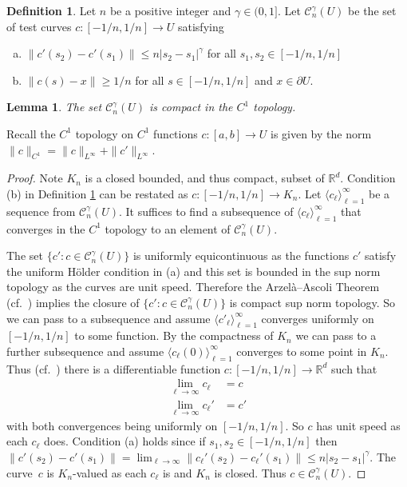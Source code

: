\documentclass[12pt]{amsart}
\numberwithin{equation}{section}
\newcommand{\la}{\langle}	   	%
\newcommand{\ra}{\rangle}          	%
\newcommand{\R}{{\mathbb R}}		%
\newcommand{\cn}{\colon}                %
\newtheorem{lemma}[thm]{Lemma}
\theoremstyle{definition}
\newtheorem{defn}[thm]{Definition}
\theoremstyle{remark}
\newcommand{\f}{\partial}
\begin{document}
 
\begin{defn}\label{def:Cn}
Let  $n$ be a positive integer and $\gamma\in (0,1]$.
Let $\mathcal C_n^\gamma (U)$ be the 
set of test curves  $c\cn [-1/n,1/n] \to U$ satisfying 
\begin{enumerate}[(a)]
    \item $\|c'(s_2) - c'(s_1)\| \le n | s_2 - s_1|^{\gamma} $ for all 
      $s_1, s_2\in [-1/n,1/n]$
    \item $\| c(s) - x\|\ge 1/n$ for all $s\in [-1/n,1/n]$ and $x\in \f U$.  
\end{enumerate}
\end{defn}

\begin{lemma}\label{lem:C_nc_cpt}
  The set $\mathcal C_n^\gamma (U)$ is compact in the $C^1$ topology.
\end{lemma}

Recall the $C^1$ topology on $C^1$ functions $c\cn [a,b]\to U$
is given by the
norm $\|c\|_{C^1} = \|c\|_{L^\infty} + \|c'\|_{L^\infty}$.

\begin{proof}
Note $K_n$ is a closed bounded, and thus
compact, subset of $\R^d$.
Condition (b) in  Definition \ref{def:Cn} 
can be restated as $c \cn [-1/n,1/n] \to K_n$.
%
Let $\la c_\ell \ra_{\ell=1}^\infty$
be a sequence from $\mathcal C_n^\gamma (U)$.
It suffices to find a subsequence of $\la c_\ell \ra_{\ell=1}^\infty$
that converges in the $C^1$ topology
to an element of $\mathcal C_n^\gamma (U)$.


The set $\{ c' \cn c\in \mathcal C_n^\gamma (U)\}$ 
is uniformly equicontinuous as the functions $c'$ satisfy
the uniform H\"older condition in (a) and this set is bounded in the
sup norm topology 
as the curves
are unit speed.  
Therefore the Arzel\`a–Ascoli Theorem
(cf.\ \cite[p.~137]{Folland:Analysis}) implies 
the closure of  $\{ c' \cn c\in \mathcal C_n^\gamma (U)\}$ is compact
sup norm topology. 
So we can pass to a subsequence and
assume $\la c'_\ell \ra_{\ell=1}^\infty$
converges uniformly on $[-1/n,1/n]$ to some function.
%
By the compactness of $K_n$ we can pass to
a further subsequence and assume 
$\la c_\ell (0) \ra_{\ell=1}^\infty$
converges to some point in $K_n$. 
 Thus (cf.~\cite[\S8.2]{BartleSherbert4})
 there is a differentiable function $c\cn [-1/n,1/n] \to \R^d$
 such that
\begin{align*}
 \lim_{\ell \to \infty} c_\ell &= c \\
 \lim_{\ell \to \infty} c_\ell' &= c'
\end{align*}
with both convergences being uniformly on  $[-1/n,1/n]$.
So $c$ has unit speed as each $c_\ell$ does.
Condition (a) holds since
if $s_1, s_2\in [-1/n,1/n]$
then 
 $
 \| c'(s_2) - c'(s_1)\| = \lim_{\ell \to \infty}
 \| c_\ell'(s_2) - c_\ell'(s_1) \| \le n |s_2-s_1|^{\gamma}
 $.
The curve~$c$ is $K_n$-valued as each $c_\ell$ is and $K_n$ is closed.
Thus  $c\in \mathcal C_n^\gamma (U)$.
\end{proof}
\end{document}
